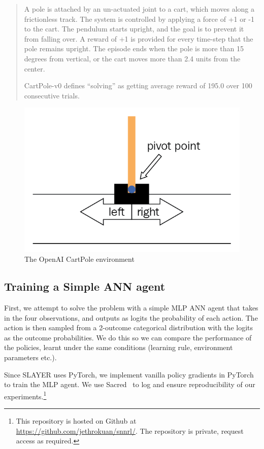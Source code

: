 \documentclass[fyp]{socreport}
\begin{document}
\begin{quote} A pole is attached by an un-actuated joint to a cart, which moves
along a frictionless track. The system is controlled by applying a force of +1
or -1 to the cart. The pendulum starts upright, and the goal is to prevent it
from falling over. A reward of +1 is provided for every time-step that the pole
remains upright. The episode ends when the pole is more than 15 degrees from
vertical, or the cart moves more than 2.4 units from the center.

CartPole-v0 defines ``solving'' as getting average reward of 195.0 over 100
consecutive trials.
\end{quote}

\begin{figure}[htbp] \centering
  \includegraphics[width=.9\linewidth]{images/openai_gym.png}
  \caption{The OpenAI CartPole environment}
\end{figure}

\subsection{Training a Simple ANN agent}

First, we attempt to solve the problem with a simple MLP ANN agent that takes in
the four observations, and outputs as logits the probability of each action. The
action is then sampled from a 2-outcome categorical distribution with the logits
as the outcome probabilities. We do this so we can compare the performance of
the policies, learnt under the same conditions (learning rule, environment
parameters etc.).

Since SLAYER uses PyTorch, we implement vanilla policy gradients in PyTorch to
train the MLP agent. We use Sacred~\cite{klaus_greff-proc-scipy-2017} to log and
ensure reproducibility of our experiments.\footnote{This repository is hosted on
Github at \url{https://github.com/jethrokuan/snnrl/}. The repository is private,
request access as required.}
\end{document}

